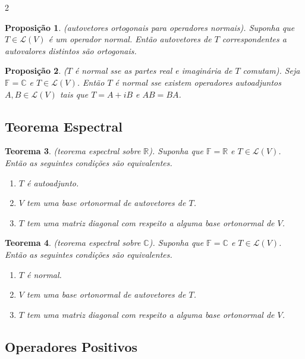 \documentclass{article}
\theoremstyle{plain}
\newtheorem{thm}{Teorema}[section]
\newtheorem{prop}[thm]{Proposição}
\theoremstyle{definition}
\theoremstyle{remark}
\begin{document}
\begin{multicols}{2}
\begin{prop} (autovetores ortogonais para operadores normais).
    Suponha que \(T \in \mathcal{L}(V)\) é um operador normal. Então autovetores de \(T\) correspondentes a autovalores distintos são ortogonais.
\end{prop}

\begin{prop} (\(T\) é normal sse as partes real e imaginária de \(T\) comutam).
    Seja \(\mathbb{F} = \mathbb{C}\) e \(T \in \mathcal{L}(V)\). Então \(T\) é normal sse existem operadores autoadjuntos \(A, B \in \mathcal{L}(V)\) tais que \(T = A + iB\) e \(AB = BA\).
\end{prop}

\subsection{Teorema Espectral}

\begin{thm} (teorema espectral sobre \(\mathbb{R}\)).
    Suponha que \(\mathbb{F} = \mathbb{R}\) e \(T \in \mathcal{L}(V)\). Então as seguintes condições são equivalentes.
    \begin{enumerate}
        \item[\textup{(a)}] \(T\) é autoadjunto.
        \item[\textup{(b)}] \(V\) tem uma base ortonormal de autovetores de \(T\).
        \item[\textup{(c)}] \(T\) tem uma matriz diagonal com respeito a alguma base ortonormal de \(V\).
    \end{enumerate}
\end{thm}

\begin{thm} (teorema espectral sobre \(\mathbb{C}\)).
    Suponha que \(\mathbb{F} = \mathbb{C}\) e \(T \in \mathcal{L}(V)\). Então as seguintes condições são equivalentes.
    \begin{enumerate}
        \item[\textup{(a)}] \(T\) é normal.
        \item[\textup{(b)}] \(V\) tem uma base ortonormal de autovetores de \(T\).
        \item[\textup{(c)}] \(T\) tem uma matriz diagonal com respeito a alguma base ortonormal de \(V\).
    \end{enumerate}
    
\end{thm}

\subsection{Operadores Positivos}


\end{multicols}
\end{document}

